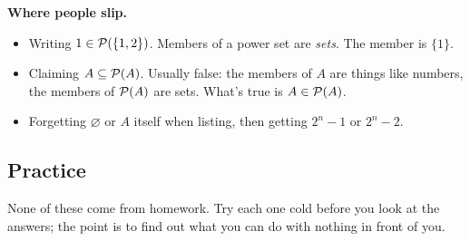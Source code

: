 \textbf{Where people slip.}
\begin{itemize}
  \item Writing $1\in\mathcal{P}(\{1,2\})$. Members of a power set are \emph{sets}. The member is $\{1\}$.
  \item Claiming $A\subseteq\mathcal{P}(A)$. Usually false: the members of $A$ are things like numbers, the members of $\mathcal{P}(A)$ are sets. What's true is $A\in\mathcal{P}(A)$.
  \item Forgetting $\varnothing$ or $A$ itself when listing, then getting $2^n-1$ or $2^n-2$.
\end{itemize}

\subsection{Practice}

None of these come from homework. Try each one cold before you look at the answers; the point is to find out what you can do with nothing in front of you.

